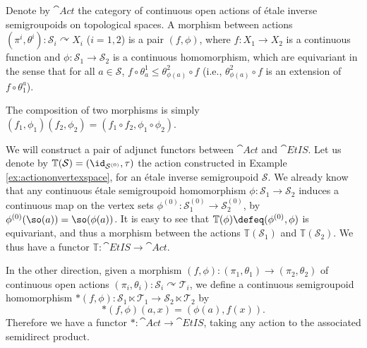 Denote by $\cat{Act}$ the category of continuous open actions of étale inverse semigroupoids on topological spaces. A morphism between actions $(\pi^i,\theta^i)\colon\mathcal{S}_i\curvearrowright X_i$ ($i=1,2$) is a pair $(f,\phi)$, where $f\colon X_1\to X_2$ is a continuous function and $\phi\colon\mathcal{S}_1\to\mathcal{S}_2$ is a continuous homomorphism, which are equivariant in the sense that for all $a\in\mathcal{S}$, $f\circ\theta^1_a\leq \theta^2_{\phi(a)}\circ f$ (i.e., $\theta^2_{\phi(a)}\circ f$ is an extension of $f\circ\theta_1^a$).

The composition of two morphisms is simply $(f_1,\phi_1)(f_2,\phi_2)=(f_1\circ f_2,\phi_1\circ\phi_2)$.

We will construct a pair of adjunct functors between $\cat{Act}$ and $\cat{EtIS}$. Let us denote by $\mathbb{T}(\mathcal{S})=(\id_{\mathcal{S}^{(0)}},\tau)$ the action constructed in Example \ref{ex:actiononvertexspace}, for an étale inverse semigroupoid $\mathcal{S}$. We already know that any continuous étale semigroupoid homomorphism $\phi\colon\mathcal{S}_1\to\mathcal{S}_2$ induces a continuous map on the vertex sets $\phi^{(0)}\colon\mathcal{S}_1^{(0)}\to\mathcal{S}_2^{(0)}$, by $\phi^{(0)}(\so(a))=\so(\phi(a))$. It is easy to see that $\mathbb{T}(\phi)\defeq(\phi^{(0)},\phi)$ is equivariant, and thus a morphism between the actions $\mathbb{T}(\mathcal{S}_1)$ and $\mathbb{T}(\mathcal{S}_2)$. We thus have a functor $\mathbb{T}\colon\cat{EtIS}\to\cat{Act}$.

In the other direction, given a morphism $(f,\phi)\colon(\pi_1,\theta_1)\to(\pi_2,\theta_2)$ of continuous open actions $(\pi_i,\theta_i)\colon\mathcal{S}_i\curvearrowright \mathcal{T}_i$, we define a continuous semigroupoid homomorphism $\ast(f,\phi)\colon\mathcal{S}_1\ltimes\mathcal{T}_1\to\mathcal{S}_2\ltimes \mathcal{T}_2$ by
\[\ast(f,\phi)(a,x)=(\phi(a),f(x)).\]
Therefore we have a functor $\ast\colon\cat{Act}\to\cat{EtIS}$, taking any action to the associated semidirect product.

